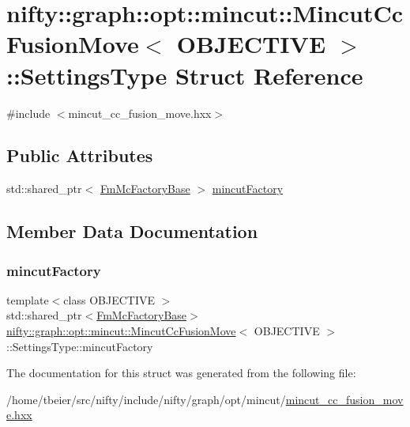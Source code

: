 \hypertarget{structnifty_1_1graph_1_1opt_1_1mincut_1_1MincutCcFusionMove_1_1SettingsType}{}\section{nifty\+:\+:graph\+:\+:opt\+:\+:mincut\+:\+:Mincut\+Cc\+Fusion\+Move$<$ O\+B\+J\+E\+C\+T\+I\+VE $>$\+:\+:Settings\+Type Struct Reference}
\label{structnifty_1_1graph_1_1opt_1_1mincut_1_1MincutCcFusionMove_1_1SettingsType}


{\ttfamily \#include $<$mincut\+\_\+cc\+\_\+fusion\+\_\+move.\+hxx$>$}

\subsection*{Public Attributes}
\begin{DoxyCompactItemize}
\item 
std\+::shared\+\_\+ptr$<$ \hyperlink{classnifty_1_1graph_1_1opt_1_1mincut_1_1MincutCcFusionMove_a822ef330a0baebfd30f7690afd5cd4ff}{Fm\+Mc\+Factory\+Base} $>$ \hyperlink{structnifty_1_1graph_1_1opt_1_1mincut_1_1MincutCcFusionMove_1_1SettingsType_a9a5fec4a635635f424f21c70774ed1cb}{mincut\+Factory}
\end{DoxyCompactItemize}


\subsection{Member Data Documentation}
\mbox{\label{structnifty_1_1graph_1_1opt_1_1mincut_1_1MincutCcFusionMove_1_1SettingsType_a9a5fec4a635635f424f21c70774ed1cb}} 
\subsubsection{\texorpdfstring{mincut\+Factory}{mincutFactory}}
{\footnotesize\ttfamily template$<$class O\+B\+J\+E\+C\+T\+I\+VE $>$ \\
std\+::shared\+\_\+ptr$<$\hyperlink{classnifty_1_1graph_1_1opt_1_1mincut_1_1MincutCcFusionMove_a822ef330a0baebfd30f7690afd5cd4ff}{Fm\+Mc\+Factory\+Base}$>$ \hyperlink{classnifty_1_1graph_1_1opt_1_1mincut_1_1MincutCcFusionMove}{nifty\+::graph\+::opt\+::mincut\+::\+Mincut\+Cc\+Fusion\+Move}$<$ O\+B\+J\+E\+C\+T\+I\+VE $>$\+::Settings\+Type\+::mincut\+Factory}



The documentation for this struct was generated from the following file\+:\begin{DoxyCompactItemize}
\item 
/home/tbeier/src/nifty/include/nifty/graph/opt/mincut/\hyperlink{mincut__cc__fusion__move_8hxx}{mincut\+\_\+cc\+\_\+fusion\+\_\+move.\+hxx}\end{DoxyCompactItemize}
